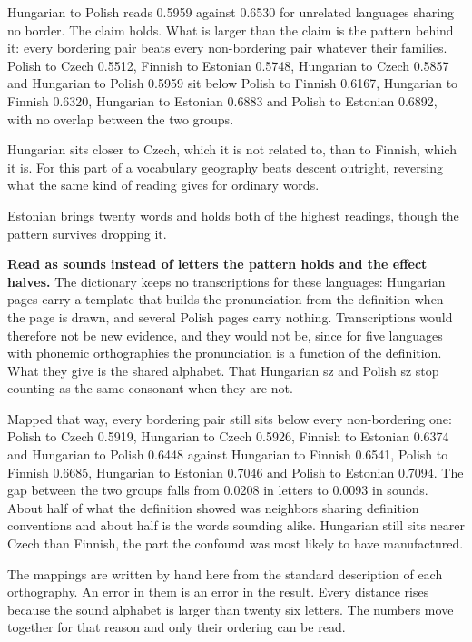 Hungarian to Polish reads 0.5959 against 0.6530 for unrelated languages sharing no border. The claim holds. What is larger than the claim is the pattern behind it: every bordering pair beats every non-bordering pair whatever their families. Polish to Czech 0.5512, Finnish to Estonian 0.5748, Hungarian to Czech 0.5857 and Hungarian to Polish 0.5959 sit below Polish to Finnish 0.6167, Hungarian to Finnish 0.6320, Hungarian to Estonian 0.6883 and Polish to Estonian 0.6892, with no overlap between the two groups.

Hungarian sits closer to Czech, which it is not related to, than to Finnish, which it is. For this part of a vocabulary geography beats descent outright, reversing what the same kind of reading gives for ordinary words.

Estonian brings twenty words and holds both of the highest readings, though the pattern survives dropping it.

\textbf{Read as sounds instead of letters the pattern holds and the effect halves.} The dictionary keeps no transcriptions for these languages: Hungarian pages carry a template that builds the pronunciation from the definition when the page is drawn, and several Polish pages carry nothing. Transcriptions would therefore not be new evidence, and they would not be, since for five languages with phonemic orthographies the pronunciation is a function of the definition. What they give is the shared alphabet. That Hungarian sz and Polish sz stop counting as the same consonant when they are not.

Mapped that way, every bordering pair still sits below every non-bordering one: Polish to Czech 0.5919, Hungarian to Czech 0.5926, Finnish to Estonian 0.6374 and Hungarian to Polish 0.6448 against Hungarian to Finnish 0.6541, Polish to Finnish 0.6685, Hungarian to Estonian 0.7046 and Polish to Estonian 0.7094. The gap between the two groups falls from 0.0208 in letters to 0.0093 in sounds. About half of what the definition showed was neighbors sharing definition conventions and about half is the words sounding alike. Hungarian still sits nearer Czech than Finnish, the part the confound was most likely to have manufactured.

The mappings are written by hand here from the standard description of each orthography. An error in them is an error in the result. Every distance rises because the sound alphabet is larger than twenty six letters. The numbers move together for that reason and only their ordering can be read.

